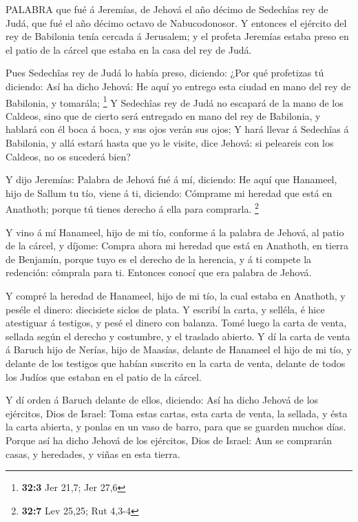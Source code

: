  PALABRA que fué á Jeremías, de Jehová el año décimo de
Sedechîas rey de Judá, que fué el año décimo octavo de Nabucodonosor.
 Y entonces el ejército del rey de Babilonia tenía cercada á
Jerusalem; y el profeta Jeremías estaba preso en el patio de la cárcel
que estaba en la casa del rey de Judá.

 Pues Sedechîas rey de Judá lo había preso, diciendo: ¿Por
qué profetizas tú diciendo: Así ha dicho Jehová: He aquí yo entrego esta
ciudad en mano del rey de Babilonia, y tomarála; \footnote{\textbf{32:3}
  Jer 21,7; Jer 27,6}  Y Sedechîas rey de Judá no escapará
de la mano de los Caldeos, sino que de cierto será entregado en mano del
rey de Babilonia, y hablará con él boca á boca, y sus ojos verán sus
ojos;  Y hará llevar á Sedechîas á Babilonia, y allá estará
hasta que yo le visite, dice Jehová: si peleareis con los Caldeos, no os
sucederá bien?

 Y dijo Jeremías: Palabra de Jehová fué á mí, diciendo:
 He aquí que Hanameel, hijo de Sallum tu tío, viene á ti,
diciendo: Cómprame mi heredad que está en Anathoth; porque tú tienes
derecho á ella para comprarla. \footnote{\textbf{32:7} Lev 25,25; Rut
  4,3-4}

 Y vino á mí Hanameel, hijo de mi tío, conforme á la palabra
de Jehová, al patio de la cárcel, y díjome: Compra ahora mi heredad que
está en Anathoth, en tierra de Benjamín, porque tuyo es el derecho de la
herencia, y á ti compete la redención: cómprala para ti. Entonces conocí
que era palabra de Jehová.

 Y compré la heredad de Hanameel, hijo de mi tío, la cual
estaba en Anathoth, y peséle el dinero: diecisiete siclos de plata.
 Y escribí la carta, y selléla, é hice atestiguar á
testigos, y pesé el dinero con balanza.  Tomé luego la
carta de venta, sellada según el derecho y costumbre, y el traslado
abierto.  Y dí la carta de venta á Baruch hijo de Nerías,
hijo de Maasías, delante de Hanameel el hijo de mi tío, y delante de los
testigos que habían suscrito en la carta de venta, delante de todos los
Judíos que estaban en el patio de la cárcel.

 Y dí orden á Baruch delante de ellos, diciendo:
 Así ha dicho Jehová de los ejércitos, Dios de Israel: Toma
estas cartas, esta carta de venta, la sellada, y ésta la carta abierta,
y ponlas en un vaso de barro, para que se guarden muchos días.
 Porque así ha dicho Jehová de los ejércitos, Dios de
Israel: Aun se comprarán casas, y heredades, y viñas en esta tierra.

